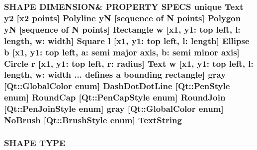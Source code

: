 \subsubsection[{\texorpdfstring{Text\+String}{TextString}}]{\setlength{\rightskip}{0pt plus 5cm}S\+H\+A\+PE D\+I\+M\+E\+N\+S\+I\+ON\& P\+R\+O\+P\+E\+R\+TY S\+P\+E\+CS unique {\bf Text} {\bf y2} \mbox{[}{\bf x2} points\mbox{]} {\bf Polyline} yN \mbox{[}sequence of N points\mbox{]} {\bf Polygon} yN \mbox{[}sequence of N points\mbox{]} {\bf Rectangle} w \mbox{[}{\bf x1}, y1\+: top left, l\+: length, w\+: width\mbox{]} {\bf Square} {\bf l} \mbox{[}{\bf x1}, y1\+: top left, l\+: length\mbox{]} {\bf Ellipse} b \mbox{[}{\bf x1}, y1\+: top left, a\+: semi major axis, b\+: semi minor axis\mbox{]} {\bf Circle} r \mbox{[}{\bf x1}, y1\+: top left, r\+: radius\mbox{]} {\bf Text} w \mbox{[}{\bf x1}, y1\+: top left, l\+: length, w\+: width ... defines {\bf a} bounding rectangle\mbox{]} gray \mbox{[}Qt\+::\+Global\+Color enum\mbox{]} Dash\+Dot\+Dot\+Line \mbox{[}Qt\+::\+Pen\+Style enum\mbox{]} Round\+Cap \mbox{[}{\bf Qt\+::\+Pen\+Cap\+Style} enum\mbox{]} Round\+Join \mbox{[}{\bf Qt\+::\+Pen\+Join\+Style} enum\mbox{]} gray \mbox{[}Qt\+::\+Global\+Color enum\mbox{]} No\+Brush \mbox{[}{\bf Qt\+::\+Brush\+Style} enum\mbox{]} Text\+String}\hypertarget{shape__input__file__specs_8txt_ad48ae5b86ba47f707c0ef94fb9249560}{}\label{shape__input__file__specs_8txt_ad48ae5b86ba47f707c0ef94fb9249560}
\subsubsection[{\texorpdfstring{T\+Y\+PE}{TYPE}}]{\setlength{\rightskip}{0pt plus 5cm}S\+H\+A\+PE T\+Y\+PE}\hypertarget{shape__input__file__specs_8txt_a4846c923b7033536e65792b7e6d2040b}{}\label{shape__input__file__specs_8txt_a4846c923b7033536e65792b7e6d2040b}
